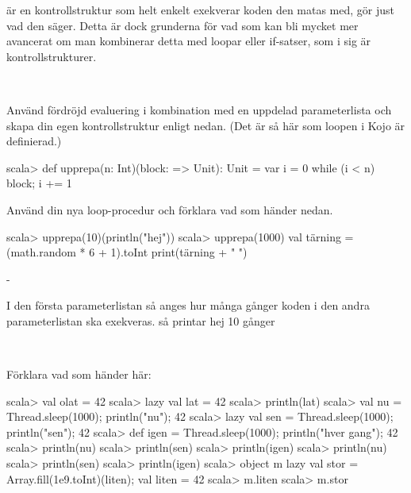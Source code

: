 
\SubtaskSolved  {} är en kontrollstruktur som helt enkelt exekverar koden den matas med,  gör just vad den säger. Detta är dock grunderna för vad som kan bli mycket mer avancerat om man kombinerar detta med loopar eller if-satser, som i sig är kontrollstrukturer.

\QUESTEND





\QUESTBEGIN

\Task  \what~

\Subtask Använd fördröjd evaluering i kombination med en uppdelad parameterlista och skapa din egen kontrollstruktur enligt nedan. (Det är så här som loopen  i Kojo är definierad.)
\begin{REPL}
scala> def upprepa(n: Int)(block: => Unit): Unit = {
         var i = 0
         while (i < n) {block; i += 1}
       }
\end{REPL}

\Subtask Använd din nya loop-procedur och förklara vad som händer nedan.
\begin{REPL}
scala> upprepa(10)(println("hej"))
scala> upprepa(1000){
  val tärning = (math.random * 6 + 1).toInt
  print(tärning + " ")
}
\end{REPL}

\SOLUTION

\TaskSolved \what

\SubtaskSolved  -

\SubtaskSolved  I den första parameterlistan så anges hur många gånger koden i den andra parameterlistan ska exekveras. så  printar hej 10 gånger

\QUESTEND







\QUESTBEGIN

\Task  \what~

\Subtask \label{subtask:delayalloc} Förklara vad som händer här:
\begin{REPL}
scala> val olat = 42
scala> lazy val lat = 42
scala> println(lat)
scala> val nu = {Thread.sleep(1000); println("nu"); 42}
scala> lazy val sen = {Thread.sleep(1000); println("sen"); 42}
scala> def igen = {Thread.sleep(1000); println("hver gang"); 42}
scala> println(nu)
scala> println(sen)
scala> println(igen)
scala> println(nu)
scala> println(sen)
scala> println(igen)
scala> object m {lazy val stor = Array.fill(1e9.toInt)(liten); val liten = 42}
scala> m.liten
scala> m.stor
\end{REPL}


